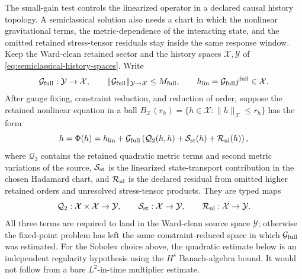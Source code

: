 \begin{controlledapproximation}
\label{ca:semiclassical-nonlinear-backreaction-chart}
The small-gain test controls the linearized operator in a declared causal
history topology.  A semiclassical solution also needs a chart in which the
nonlinear gravitational terms, the metric-dependence of the interacting state,
and the omitted retained stress-tensor residuals stay inside the same response
window.  Keep the Ward-clean retained sector and the history spaces
\(\mathcal X,\mathcal Y\) of \eqref{eq:semiclassical-history-spaces}.  Write
\[
  \mathcal G_{\rm full}:\mathcal Y\to\mathcal X,
  \qquad
  \lVert\mathcal G_{\rm full}\rVert_{\mathcal Y\to\mathcal X}
  \le M_{\rm full},
  \qquad
  h_{\rm lin}
  =
  \mathcal G_{\rm full}j^{\rm full}\in\mathcal X .
\]
After gauge fixing, constraint reduction, and reduction of order, suppose the
retained nonlinear equation in a ball
\(B_{\mathcal X}(r_h)=\{h\in\mathcal X:\lVert h\rVert_{\mathcal X}\le r_h\}\)
has the form
\begin{equation}
  h=\Phi(h)
  =
  h_{\rm lin}
  +
  \mathcal G_{\rm full}
  \left(
    \mathcal Q_2(h,h)+\mathcal S_{\rm st}(h)+\mathcal R_{\rm nl}(h)
  \right),
  \label{eq:semiclassical-nonlinear-fixed-map}
\end{equation}
where \(\mathcal Q_2\) contains the retained quadratic metric terms and
second metric variations of the source, \(\mathcal S_{\rm st}\) is the
linearized state-transport contribution in the chosen Hadamard chart, and
\(\mathcal R_{\rm nl}\) is the declared residual from omitted higher retained
orders and unresolved stress-tensor products.  They are typed maps
\[
  \mathcal Q_2:\mathcal X\times\mathcal X\to\mathcal Y,
  \qquad
  \mathcal S_{\rm st}:\mathcal X\to\mathcal Y,
  \qquad
  \mathcal R_{\rm nl}:\mathcal X\to\mathcal Y .
\]
All three terms are required to land in the Ward-clean source space
\(\mathcal Y\); otherwise the fixed-point problem has left the same
constraint-reduced space in which \(\mathcal G_{\rm full}\) was estimated.
For the Sobolev choice above, the quadratic estimate below is an independent
regularity hypothesis using the \(H^s\) Banach-algebra bound.  It would not
follow from a bare \(L^2\)-in-time multiplier estimate.


\end{controlledapproximation}
